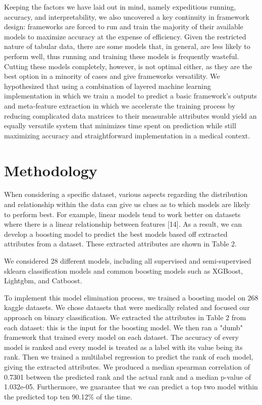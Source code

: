 \documentclass{article}
\begin{document}
Keeping the factors we have laid out in mind, namely expeditious running, accuracy, and interpretability, we also uncovered a key continuity in framework design: frameworks are forced to run and train the majority of their available models to maximize accuracy at the expense of efficiency. Given the restricted nature of tabular data, there are some models that, in general, are less likely to perform well, thus running and training these models is frequently wasteful. Cutting these models completely, however, is not optimal either, as they are the best option in a minority of cases and give frameworks versatility. We hypothesized that using a combination of layered machine learning implementation in which we train a model to predict a basic framework's outputs and meta-feature extraction in which we accelerate the training process by reducing complicated data matrices to their measurable attributes would yield an equally versatile system that minimizes time spent on prediction while still maximizing accuracy and straightforward implementation in a medical context. 

\section{Methodology}
When considering a specific dataset, various aspects regarding the distribution and relationship within the data can give us clues as to which models are likely to perform best. For example, linear models tend to work better on datasets where there is a linear relationship between features [14]. As a result, we can develop a boosting model to predict the best models based off extracted attributes from a dataset. These extracted attributes are shown in Table 2. 

We considered 28 different models, including all supervised and semi-supervised sklearn classification models and common boosting models such as XGBoost, Lightgbm, and Catboost.

To implement this model elimination process, we trained a boosting model on 268 kaggle datasets. We chose datasets that were medically related and focused our approach on binary classification. We extracted the attributes in Table 2 from each dataset: this is the input for the boosting model. We then ran a "dumb" framework that trained every model on each dataset. The accuracy of every model is ranked and every model is treated as a label with its value being its rank. Then we trained a multilabel regression to predict the rank of each model, giving the extracted attributes. We produced a median spearman correlation of 0.7301 between the predicted rank and the actual rank and a median p-value of 1.032e-05. Furthermore, we guarantee that we can predict a top two model within the predicted top ten 90.12\% of the time.
\end{document}

